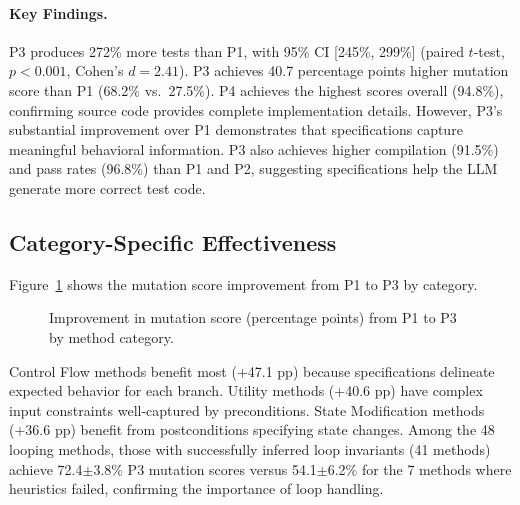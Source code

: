 \paragraph{Key Findings.}
P3 produces 272\% more tests than P1, with 95\% CI [245\%, 299\%] (paired $t$-test, $p < 0.001$, Cohen's $d = 2.41$). P3 achieves 40.7 percentage points higher mutation score than P1 (68.2\% vs.\ 27.5\%). P4 achieves the highest scores overall (94.8\%), confirming source code provides complete implementation details. However, P3's substantial improvement over P1 demonstrates that specifications capture meaningful behavioral information. P3 also achieves higher compilation (91.5\%) and pass rates (96.8\%) than P1 and P2, suggesting specifications help the LLM generate more correct test code.

\subsection{Category-Specific Effectiveness}

Figure~\ref{fig:improvement-by-category} shows the mutation score improvement from P1 to P3 by category.

\begin{figure}[ht]
\centering
{}
\caption{Improvement in mutation score (percentage points) from P1 to P3 by method category.}
\label{fig:improvement-by-category}
\end{figure}

Control Flow methods benefit most (+47.1 pp) because specifications delineate expected behavior for each branch. Utility methods (+40.6 pp) have complex input constraints well-captured by preconditions. State Modification methods (+36.6 pp) benefit from postconditions specifying state changes. Among the 48 looping methods, those with successfully inferred loop invariants (41 methods) achieve 72.4$\pm$3.8\% P3 mutation scores versus 54.1$\pm$6.2\% for the 7 methods where heuristics failed, confirming the importance of loop handling.

